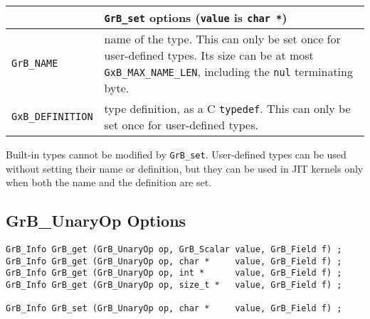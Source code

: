 \noindent
{\small
\begin{tabular}{p{2.2in}p{3.5in}}
\hline
                                    & \verb'GrB_set' options (\verb'value' is \verb'char *') \\
\hline
\verb'GrB_NAME'                     & name of the type.  This can only be set once for user-defined types.
                                        Its size can be at most \verb'GxB_MAX_NAME_LEN', including the
                                        \verb'nul' terminating byte. \\
\verb'GxB_DEFINITION'               & type definition, as a C \verb'typedef'.  This can only be set once for
                                            user-defined types. \\
\end{tabular}
}

Built-in types cannot be modified by \verb'GrB_set'.  User-defined types can be
used without setting their name or definition, but they can be used in JIT
kernels only when both the name and the definition are set.

\newpage
\subsection{{\sf GrB\_UnaryOp} Options}
\label{get_set_unop}

\begin{mdframed}[userdefinedwidth=6in]
{\footnotesize
\begin{verbatim}
GrB_Info GrB_get (GrB_UnaryOp op, GrB_Scalar value, GrB_Field f) ;
GrB_Info GrB_get (GrB_UnaryOp op, char *     value, GrB_Field f) ;
GrB_Info GrB_get (GrB_UnaryOp op, int *      value, GrB_Field f) ;
GrB_Info GrB_get (GrB_UnaryOp op, size_t *   value, GrB_Field f) ;

GrB_Info GrB_set (GrB_UnaryOp op, char *     value, GrB_Field f) ;
\end{verbatim}
}\end{mdframed}

